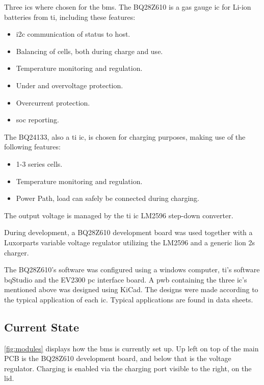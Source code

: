 Three \gls{ic}s where chosen for the \gls{bms}. The BQ28Z610 is a gas gauge \gls{ic} for Li-ion batteries from \gls{ti}, including these features:

\begin{itemize}[noitemsep]
	\item \gls{i2c} communication of status to host.
	\item Balancing of cells, both during charge and use.
	\item Temperature monitoring and regulation.
	\item Under and overvoltage protection.
	\item Overcurrent protection.
	\item \gls{soc} reporting.
\end{itemize}

The BQ24133, also a \gls{ti} \gls{ic}, is chosen for charging purposes, making use of the following features:

\begin{itemize}[noitemsep]
	\item 1-3 series cells.
	\item Temperature monitoring and regulation.
	\item Power Path, load can safely be connected during charging.
\end{itemize}

The output voltage is managed by the \gls{ti} \gls{ic} LM2596 step-down converter.

During development, a BQ28Z610 development board was used together with a Luxorparts variable voltage regulator utilizing the LM2596 and a generic \gls{lion} \gls{2s} charger.

The BQ28Z610's software was configured using a windows computer, \gls{ti}'s software bqStudio\cite{bqStudio} and the EV2300 \gls{pc} interface board.
A \gls{pwb} containing the three \gls{ic}'s mentioned above was designed using KiCad\cite{kicad}. The designs were made according to the typical application of each \gls{ic}. Typical applications are found in data sheets.  

\subsection{Current State}
\autoref{fig:modules} displays how the \gls{bms} is currently set up. Up left on top of the main PCB is the BQ28Z610 development board, and below that is the voltage regulator. Charging is enabled via the charging port visible to the right, on the lid.

